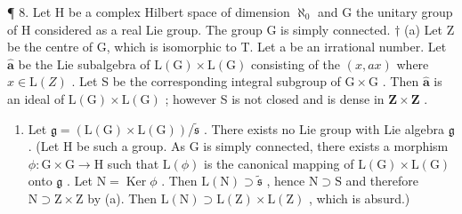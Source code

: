 ¶ 8. Let H be a complex Hilbert space of dimension \(\aleph_{0}\) and G the unitary group of H considered as a real Lie group. The group G is simply connected. \(\dagger\) (a) Let Z be the centre of G, which is isomorphic to T. Let a be an irrational number. Let \(\hat{\mathbf{a}}\) be the Lie subalgebra of \(\mathrm{L}(\mathrm{G})\times \mathrm{L}(\mathrm{G})\) consisting of the \((x,ax)\) where \(x\in \mathrm{L}(Z)\) . Let S be the corresponding integral subgroup of \(\mathrm{G}\times \mathrm{G}\) . Then \(\hat{\mathbf{a}}\) is an ideal of \(\mathrm{L}(\mathrm{G})\times \mathrm{L}(\mathrm{G})\) ; however S is not closed and is dense in \(\mathbf{Z}\times \mathbf{Z}\) .

\begin{enumerate}
\def\labelenumi{(\alph{enumi})}
\setcounter{enumi}{1}
\tightlist
\item
  Let \(\mathfrak{g} = (\mathrm{L}(\mathrm{G})\times \mathrm{L}(\mathrm{G})) / \tilde{\mathfrak{s}}\) . There exists no Lie group with Lie algebra \(\mathfrak{g}\) . (Let \(\mathrm{H}\) be such a group. As \(\mathrm{G}\) is simply connected, there exists a morphism \(\phi : \mathrm{G}\times \mathrm{G}\to \mathrm{H}\) such that \(\mathrm{L}(\phi)\) is the canonical mapping of \(\mathrm{L}(\mathrm{G})\times \mathrm{L}(\mathrm{G})\) onto \(\mathfrak{g}\) . Let \(\mathrm{N} = \operatorname{Ker}\phi\) . Then \(\mathrm{L}(\mathrm{N})\supset \tilde{\mathfrak{s}}\) , hence \(\mathrm{N}\supset \mathrm{S}\) and therefore \(\mathrm{N}\supset \mathrm{Z}\times \mathrm{Z}\) by (a). Then \(\mathrm{L}(\mathrm{N})\supset \mathrm{L}(\mathrm{Z})\times \mathrm{L}(\mathrm{Z})\) , which is absurd.)
\end{enumerate}

